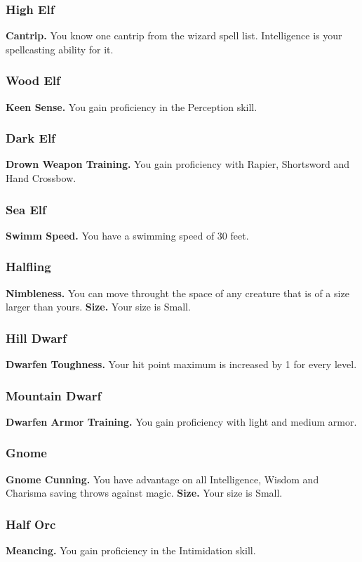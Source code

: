 \documentclass[a4paper,10pt,twoside,twocolumn]{dndbook} %
\begin{document}
	\subsubsection{High Elf}
	\textbf{Cantrip.} You know one cantrip from the wizard spell list. Intelligence is your spellcasting ability for it.
	\subsubsection{Wood Elf}
	\textbf{Keen Sense.} You gain proficiency in the Perception skill.
	\subsubsection{Dark Elf}
	\textbf{Drown Weapon Training.} You gain proficiency with Rapier, Shortsword and Hand Crossbow.
	\subsubsection{Sea Elf}
	\textbf{Swimm Speed.} You have a swimming speed of 30 feet.
	\subsubsection{Halfling}
	\textbf{Nimbleness.} You can move throught the space of any creature that is of a size larger than yours.\linebreak
	\textbf{Size.} Your size is Small.
	\subsubsection{Hill Dwarf}
	\textbf{Dwarfen Toughness.} Your hit point maximum is increased by 1 for every level.
	\subsubsection{Mountain Dwarf}
	\textbf{Dwarfen Armor Training.} You gain proficiency with light and medium armor.
	\subsubsection{Gnome}
	\textbf{Gnome Cunning.} You have advantage on all Intelligence, Wisdom and Charisma saving throws against magic.\linebreak
	\textbf{Size.} Your size is Small.
	\subsubsection{Half Orc}
	\textbf{Meancing.} You gain proficiency in the Intimidation skill.
\end{document}
